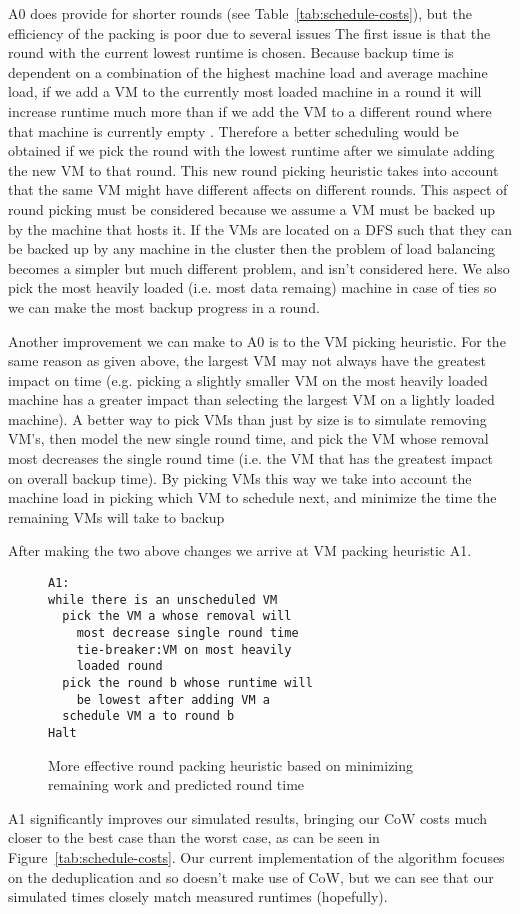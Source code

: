A0 does provide for shorter rounds (see Table~\ref{tab:schedule-costs}), but
the efficiency of the packing is poor due to several issues
The first issue is that the round with the current lowest runtime
is chosen. Because backup time is dependent on a combination of the highest
machine load and average machine load, if we add a VM to the currently most
loaded machine in a round it will increase runtime much more than if we add the
VM to a different round where that machine is currently empty
. Therefore a better scheduling
would be obtained if we pick the round with the lowest runtime after we
simulate adding the new VM to that round. This new round picking heuristic
takes into account that the same VM might have different affects on different
rounds. This aspect of round picking must be considered because we assume a VM
must be backed
up by the machine that hosts it. If the VMs are located on a DFS such that they
can be
backed up by any machine in the cluster then the problem of load balancing
becomes a simpler but much different problem, and isn't considered here. We
also pick the most heavily loaded (i.e. most data remaing) machine in case of
ties so we can make the most backup progress in a round.

Another improvement we can make to A0 is to the VM picking heuristic. For the
same reason as given above, the largest VM may not always have the greatest
impact on time (e.g. picking a slightly smaller VM on the most heavily loaded
machine has a greater impact than selecting the largest VM on a lightly loaded
machine). A better way to pick VMs than just by size is to simulate removing
VM's, then model the new single round time, and pick the VM whose removal most
decreases the single round time (i.e. the VM that has the greatest impact on
overall backup time). By picking VMs this way we take into account
the machine load in picking which VM to schedule next, and minimize the time
the remaining VMs will take to backup

After making the two above changes we arrive at VM packing heuristic A1.

\begin{figure}
\begin{lstlisting}[frame=single]
A1:
while there is an unscheduled VM
  pick the VM a whose removal will
    most decrease single round time
    tie-breaker:VM on most heavily
    loaded round
  pick the round b whose runtime will
    be lowest after adding VM a
  schedule VM a to round b
Halt
\end{lstlisting}
\caption{More effective round packing heuristic based on minimizing remaining work and predicted round time}
\end{figure}

A1 significantly improves our simulated results, bringing our CoW costs much
closer to the best case than the worst case, as can be seen in
Figure~\ref{tab:schedule-costs}.  Our current implementation of the algorithm
focuses on the deduplication and so doesn't make use of CoW, but we can see
that our simulated times closely match measured runtimes (hopefully). 
